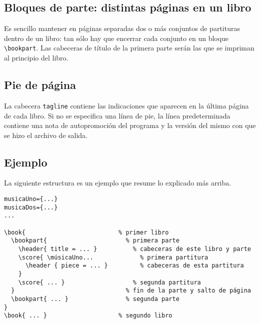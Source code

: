 \subsection{Bloques de parte: distintas páginas en un libro}

Es sencillo mantener en páginas separadas dos o más conjuntos de
partituras dentro de un libro: tan sólo hay que encerrar cada conjunto
en un bloque \verb+\bookpart+.  Las cabeceras de título de la primera
parte serán las que se impriman al principio del libro.

\subsection{Pie de página}
\label{tagline}

La cabecera \verb+tagline+ contiene las indicaciones que aparecen en
la última página de cada libro.  Si no se especifica una línea de pie,
la línea predeterminada contiene una nota de autopromoción del
programa y la versión del mismo con que se hizo el archivo de salida.

\subsection{Ejemplo}

La siguiente estructura es un ejemplo que resume lo explicado más
arriba.

\begin{verbatim}
musicaUno={...}
musicaDos={...}
...

\book{                          % primer libro
  \bookpart{                      % primera parte
    \header{ title = ... }          % cabeceras de este libro y parte  
    \score{ \músicaUno...             % primera partitura
      \header { piece = ... }         % cabeceras de esta partitura  
    }
    \score{ ... }                   % segunda partitura
  }                               % fin de la parte y salto de página
  \bookpart{ ... }                % segunda parte
}
\book{ ... }                    % segundo libro
\end{verbatim}
